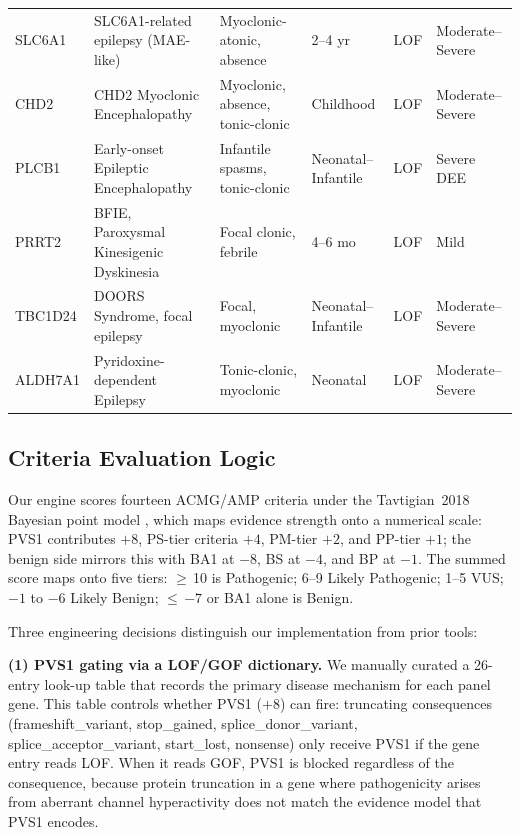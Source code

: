 \documentclass[conference]{IEEEtran}
\begin{document}
\begin{table}[!t]
\begin{center}
\begin{tabular}{p{1.1cm}p{3.8cm}p{3.8cm}p{2.2cm}p{0.8cm}p{2.2cm}}
SLC6A1  & SLC6A1-related epilepsy (MAE-like)          & Myoclonic-atonic, absence               & 2--4 yr               & LOF     & Moderate--Severe \\
CHD2    & CHD2 Myoclonic Encephalopathy               & Myoclonic, absence, tonic-clonic        & Childhood             & LOF     & Moderate--Severe \\
PLCB1   & Early-onset Epileptic Encephalopathy        & Infantile spasms, tonic-clonic          & Neonatal--Infantile   & LOF     & Severe DEE \\
PRRT2   & BFIE, Paroxysmal Kinesigenic Dyskinesia     & Focal clonic, febrile                   & 4--6 mo               & LOF     & Mild \\
TBC1D24 & DOORS Syndrome, focal epilepsy              & Focal, myoclonic                        & Neonatal--Infantile   & LOF     & Moderate--Severe \\
ALDH7A1 & Pyridoxine-dependent Epilepsy               & Tonic-clonic, myoclonic                 & Neonatal              & LOF     & Moderate--Severe \\
\bottomrule
\end{tabular}
\end{center}
\end{table}

\subsection{Criteria Evaluation Logic}

Our engine scores fourteen ACMG/AMP criteria under the
Tavtigian~2018 Bayesian point model \cite{tavtigian2018}, which
maps evidence strength onto a numerical scale: PVS1 contributes
$+8$, PS-tier criteria $+4$, PM-tier $+2$, and PP-tier $+1$; the
benign side mirrors this with BA1 at $-8$, BS at $-4$, and BP at
$-1$. The summed score maps onto five tiers: $\geq$\,10 is
Pathogenic; 6--9 Likely Pathogenic; 1--5 VUS; $-1$ to $-6$
Likely Benign; $\leq$\,$-7$ or BA1 alone is Benign.

Three engineering decisions distinguish our implementation from
prior tools:

\textbf{(1) PVS1 gating via a LOF/GOF dictionary.}
We manually curated a 26-entry look-up table that records the
primary disease mechanism for each panel gene. This table controls
whether PVS1 ($+8$) can fire: truncating consequences
(frameshift\_variant, stop\_gained, splice\_donor\_variant,
splice\_acceptor\_variant, start\_lost, nonsense) only receive
PVS1 if the gene entry reads LOF. When it reads GOF, PVS1 is
blocked regardless of the consequence, because protein truncation
in a gene where pathogenicity arises from aberrant channel
hyperactivity does not match the evidence model that PVS1 encodes.
\end{document}
